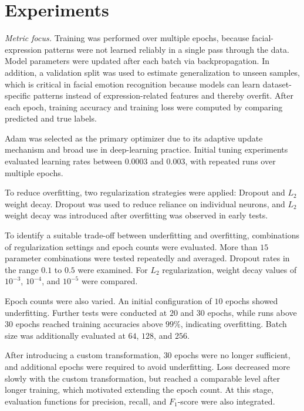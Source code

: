 \section{Experiments}
\label{sec:experiments}

\textit{Metric focus.}
Training was performed over multiple epochs, because facial-expression patterns were not learned reliably in a single pass through the data. Model parameters were updated after each batch via backpropagation. In addition, a validation split was used to estimate generalization to unseen samples, which is critical in facial emotion recognition because models can learn dataset-specific patterns instead of expression-related features and thereby overfit. After each epoch, training accuracy and training loss were computed by comparing predicted and true labels.

Adam was selected as the primary optimizer due to its adaptive update mechanism and broad use in deep-learning practice. Initial tuning experiments evaluated learning rates between \(0.0003\) and \(0.003\), with repeated runs over multiple epochs.

To reduce overfitting, two regularization strategies were applied: Dropout and \(L_2\) weight decay. Dropout was used to reduce reliance on individual neurons, and \(L_2\) weight decay was introduced after overfitting was observed in early tests.

To identify a suitable trade-off between underfitting and overfitting, combinations of regularization settings and epoch counts were evaluated. More than \(15\) parameter combinations were tested repeatedly and averaged. Dropout rates in the range \(0.1\) to \(0.5\) were examined. For \(L_2\) regularization, weight decay values of \(10^{-3}\), \(10^{-4}\), and \(10^{-5}\) were compared.

Epoch counts were also varied. An initial configuration of \(10\) epochs showed underfitting. Further tests were conducted at \(20\) and \(30\) epochs, while runs above \(30\) epochs reached training accuracies above \(99\%\), indicating overfitting. Batch size was additionally evaluated at \(64\), \(128\), and \(256\).

After introducing a custom transformation, \(30\) epochs were no longer sufficient, and additional epochs were required to avoid underfitting. Loss decreased more slowly with the custom transformation, but reached a comparable level after longer training, which motivated extending the epoch count. At this stage, evaluation functions for precision, recall, and \(F_1\)-score were also integrated.

